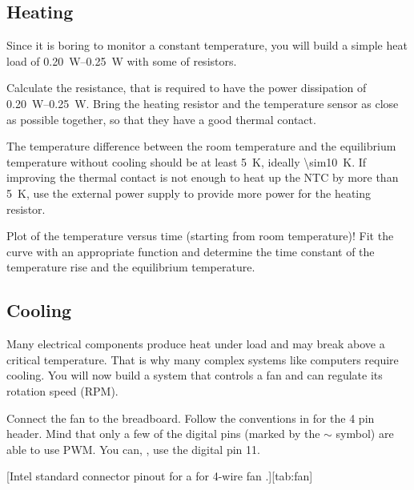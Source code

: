 \subsection{Heating}\label{sec:heat}
Since it is boring to monitor a constant temperature, you will build a simple heat load of \SIrange{.20}{.25}{\W} with some of resistors.\par
%
\begin{task}
  Calculate the resistance, that is required to have the power dissipation of \SIrange{.20}{.25}{\W}. Bring the heating resistor and the temperature sensor as close as possible together, so that they have a good thermal contact.
\end{task}
%
\begin{note}
  The temperature difference between the room temperature and the equilibrium temperature without cooling should be at least \SI{5}{\kelvin}, ideally \SI{\sim10}{\kelvin}. If improving the thermal contact is not enough to heat up the \ac{NTC} by more than \SI{5}{\kelvin}, use the external power supply to provide more power for the heating resistor.
\end{note}
%
\begin{task}
  Plot of the temperature versus time (starting from room temperature)! Fit the curve with an appropriate function and determine the time constant of the temperature rise and the equilibrium temperature.
\end{task}
%
\subsection{Cooling}\label{sec:cool}
Many electrical components produce heat under load and may break above a critical temperature. That is why many complex systems like computers require cooling. You will now build a system that controls a fan and can regulate its rotation speed (\ac{RPM}).\par
%
\begin{task}
  Connect the fan to the breadboard. Follow the conventions in  for the 4 pin header. Mind that only a few of the digital pins (marked by the $\sim$ symbol) are able to use \ac{PWM}. You can, \eg, use the digital pin 11.
\end{task}
%
[Intel standard connector pinout for a for 4-wire fan \cite{fanpinout}.][tab:fan]
%
